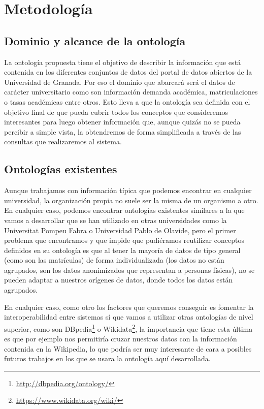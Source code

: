 \chapter{Metodología}

\section{Dominio y alcance de la ontología}

La ontología propuesta tiene el objetivo de describir la información que está contenida en los diferentes conjuntos de datos del portal de datos abiertos de la {\sf Universidad de Granada}. Por eso el dominio que abarcará será el datos de carácter universitario como son información demanda académica, matriculaciones o tasas académicas entre otros.
\bigskip
Esto lleva a que la ontología sea definida con el objetivo final de que pueda cubrir todos los conceptos que consideremos interesantes para luego obtener información que, aunque quizás no se pueda percibir a simple vista, la obtendremos de forma simplificada a través de las consultas que realizaremos al sistema.

\section{Ontologías existentes}

Aunque trabajamos con información típica que podemos encontrar en cualquier universidad, la organización propia no suele ser la misma de un organismo a otro. En cualquier caso, podemos encontrar ontologías existentes similares a la que vamos a desarrollar que se han utilizado en otras universidades como la {\sf Universitat Pompeu Fabra} o {\sf Universidad Pablo de Olavide}, pero el primer problema que encontramos y que impide que pudiéramos reutilizar conceptos definidos en su ontología es que al tener la mayoría de datos de tipo general (como son las matrículas) de forma individualizada (los datos no están agrupados, son los datos anonimizados que representan a personas físicas), no se pueden adaptar a nuestros orígenes de datos, donde todos los datos están agrupados.

\newpage
En cualquier caso, como otro los factores que queremos conseguir es fomentar la interoperabilidad entre sistemas sí que vamos a utilizar otras ontologías de nivel superior, como son {\sf DBpedia}\footnote{\url{http://dbpedia.org/ontology/}} o  {\sf Wikidata}\footnote{\url{https://www.wikidata.org/wiki/}}, la importancia que tiene esta última es que por ejemplo nos permitiría cruzar nuestros datos con la información contenida en la {\sf Wikipedia}, lo que podría ser muy interesante de cara a posibles futuros trabajos en los que se usara la ontología aquí desarrollada.

